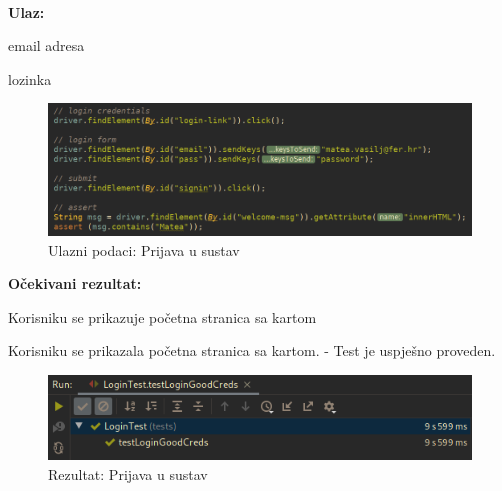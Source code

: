 			\noindent {}
			
			\
			
			\noindent \textbf{Ulaz:}
			
			\begin{packed_enum}		
				\item email adresa
				\item lozinka
				
				
			\end{packed_enum}

			\begin{figure}[H]
					\includegraphics[scale=0.57]{figures/login-code.PNG}
					\centering
					\caption{Ulazni podaci: Prijava u sustav}
					\label{fig:Prijava u sustav}
				\end{figure}	

			\noindent \textbf{Očekivani rezultat:}
				\begin{packed_enum}
				\item Korisniku se prikazuje početna stranica sa kartom
							
				
			\end{packed_enum}
			
		
				Korisniku se prikazala početna stranica sa kartom.	- Test je uspješno proveden.	
			
			
				\begin{figure}[H]
					\includegraphics[scale=0.57]{figures/login-pass.PNG}
					\centering
					\caption{Rezultat: Prijava u sustav}
					\label{fig:Prijava u sustav}
				\end{figure}
			
				\noindent {}
			
